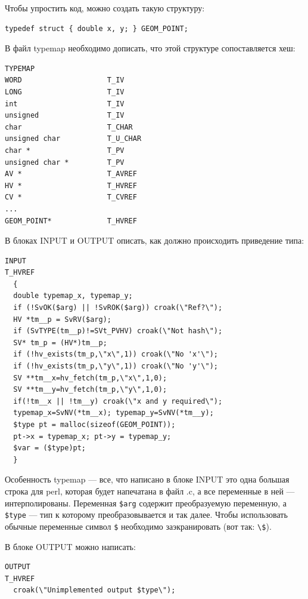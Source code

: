 Чтобы упростить код, можно создать такую структуру:
\begin{verbatim}
typedef struct { double x, y; } GEOM_POINT;
\end{verbatim}
В файл typemap необходимо дописать, что этой структуре сопоставляется хеш:
\begin{verbatim}
TYPEMAP
WORD                    T_IV
LONG                    T_IV
int                     T_IV
unsigned                T_IV
char                    T_CHAR
unsigned char           T_U_CHAR
char *                  T_PV
unsigned char *         T_PV
AV *                    T_AVREF
HV *                    T_HVREF
CV *                    T_CVREF
...
GEOM_POINT*             T_HVREF
\end{verbatim}
В блоках INPUT и OUTPUT описать, как должно происходить приведение типа:
\begin{verbatim}
INPUT
T_HVREF
  {
  double typemap_x, typemap_y;
  if (!SvOK($arg) || !SvROK($arg)) croak(\"Ref?\");
  HV *tm__p = SvRV($arg);
  if (SvTYPE(tm__p)!=SVt_PVHV) croak(\"Not hash\");
  SV* tm_p = (HV*)tm__p;
  if (!hv_exists(tm_p,\"x\",1)) croak(\"No 'x'\");
  if (!hv_exists(tm_p,\"y\",1)) croak(\"No 'y'\");
  SV **tm__x=hv_fetch(tm_p,\"x\",1,0);
  SV **tm__y=hv_fetch(tm_p,\"y\",1,0);
  if(!tm__x || !tm__y) croak(\"x and y required\");
  typemap_x=SvNV(*tm__x); typemap_y=SvNV(*tm__y);
  $type pt = malloc(sizeof(GEOM_POINT));
  pt->x = typemap_x; pt->y = typemap_y;
  $var = ($type)pt;
  }
\end{verbatim}
Особенность typemap --- все, что написано в блоке INPUT это одна большая строка для perl, которая будет напечатана в файл .c, а все переменные в ней --- интерполированы. Переменная \verb|$arg| содержит преобразуемую переменную, а \verb|$type| --- тип к которому преобразовывается и так далее. Чтобы использовать обычные переменные символ \verb|$| необходимо заэкранировать (вот так: \verb|\$|).

В блоке OUTPUT можно написать:
\begin{verbatim}
OUTPUT
T_HVREF
  croak(\"Unimplemented output $type\");
\end{verbatim}

